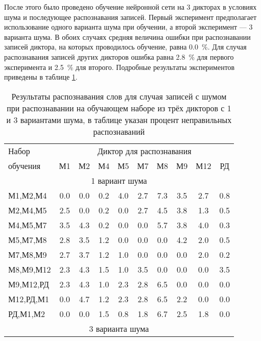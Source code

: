 После этого было проведено обучение нейронной сети на 3 дикторах в условиях шума и последующее распознавания записей.
Первый эксперимент предполагает использование одного варианта шума при обучении, а второй эксперимент --- 3 варианта шума.
В обоих случаях средняя величина ошибки при распознавании записей диктора, на которых проводилось обучение, равна 0.0~\%.
Для случая распознавания записей других дикторов ошибка равна 2.8~\% для первого эксперимента и 2.5~\% для второго.
Подробные результаты экспериментов приведены в таблице \ref{tab:cnn_noise_3dictors}.

\begin{table}[h]
	\centering
	\caption{Результаты распознавания слов для случая записей с шумом при распознавании на обучающем наборе из трёх дикторов с 1 и 3 вариантами шума, в таблице указан процент неправильных распознаваний}
	\label{tab:cnn_noise_3dictors}
	\begin{tabular}{| l | c | c | c | c | c | c | c | c | c |}
		\hline
		Набор & \multicolumn{9}{c|}{Диктор для распознавания} \\
		\hhline{~---------}
		обучения  & \phantom{0}М1\phantom{0} & \phantom{0}М2\phantom{0} & \phantom{0}М4\phantom{0} & \phantom{0}М5\phantom{0} & \phantom{0}М7\phantom{0} & \phantom{0}М8\phantom{0} & \phantom{0}М9\phantom{0} & \phantom{0}М12\phantom{0} & \phantom{0}РД\phantom{0} \\
		\hline
		\multicolumn{10}{|c|}{1 вариант шума} \\
		\hline
		М1,М2,М4  & 0.0 & 0.0 & 0.2 & 4.0 & 2.7 & 7.3 & 3.5 & 2.7 & 0.8 \\
		М2,М4,М5  & 2.5 & 0.0 & 0.2 & 0.0 & 2.7 & 4.5 & 3.8 & 1.3 & 0.5 \\
		М4,М5,М7  & 3.5 & 4.3 & 0.2 & 0.0 & 0.0 & 5.7 & 3.8 & 4.0 & 0.3 \\
		М5,М7,М8  & 2.8 & 3.5 & 1.2 & 0.0 & 0.0 & 0.0 & 4.2 & 2.0 & 0.5 \\
		М7,М8,М9  & 2.7 & 3.7 & 1.2 & 1.0 & 0.0 & 0.0 & 0.0 & 2.0 & 0.2 \\
		М8,М9,М12 & 2.3 & 4.3 & 1.5 & 1.0 & 3.5 & 0.0 & 0.0 & 0.0 & 3.5 \\
		М9,М12,РД & 2.3 & 4.3 & 1.0 & 2.3 & 2.8 & 6.5 & 0.0 & 0.0 & 0.0 \\
		М12,РД,М1 & 0.0 & 4.7 & 1.2 & 2.3 & 2.8 & 6.5 & 2.2 & 0.0 & 0.0 \\
		РД,М1,М2  & 0.0 & 0.0 & 1.5 & 0.8 & 1.8 & 6.7 & 2.5 & 1.8 & 0.0 \\
		\hline
		\multicolumn{10}{|c|}{3 варианта шума} \\

\end{tabular}
\end{table}

